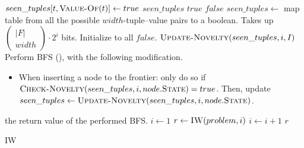 \begin{algorithm}[hbtp]
\newcommand{\nchoosek}[2]{\left(\begin{array}{c}#1 \\ #2 \end{array}\right)}
\begin{algorithmic}
      \State $seen\_tuples[t, \Call{Value-Of}{t}] \gets true$
    \EndFor
    \State \Return $seen\_tuples$
  \EndFunction
       \Return $true$
      \EndIf
    \EndFor
    \State \Return $false$
  \EndFunction
    \State $seen\_tuples \gets$ map table from all the possible
      $width$-tuple--value pairs to a boolean. Takes up $\nchoosek{|F|}{width}\cdot
      2^i$ bits. Initialize to all $false$.
    \State $\Call{Update-Novelty}{seen\_tuples, i, I}$
    \State Perform \ac{BFS} (), with the following modification.
    \begin{itemize}
      \item[] When inserting a node to the frontier: only do so if
        $\Call{Check-Novelty}{seen\_tuples, i, node.\textsc{State}} = true$. Then,
        update $seen\_tuples \gets \Call{Update-Novelty}{seen\_tuples, i,
        node.\textsc{State}}$.
    \end{itemize}
    \State \Return the return value of the performed \ac{BFS}.
  \EndFunction
    \State $i \gets 1$
    \Repeat
      \State $r \gets \Call{IW}{problem, i}$
      \State $i \gets i+1$
    \State \Return $r$
  \EndFunction
\end{algorithmic}
\caption{\acl{IW} \citep{lipovetzky2012width}}
\label{alg:iterated-width}
\end{algorithm}


